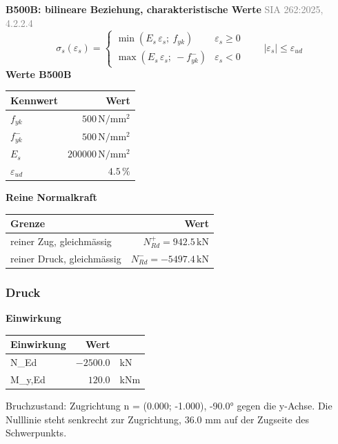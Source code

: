 \documentclass[11pt,a4paper]{article}
\newcommand{\normref}[1]{{\small\textcolor{gray}{#1}}}
\begin{document}
\noindent\textbf{B500B: bilineare Beziehung, charakteristische Werte} \hfill \normref{SIA 262:2025, 4.2.2.4}
\begin{equation*}
\sigma_s(\varepsilon_s) = \begin{cases} \min(E_s\,\varepsilon_s;\ f_{yk}) & \varepsilon_s \ge 0 \\[1ex] \max(E_s\,\varepsilon_s;\ -f_{yk}^{-}) & \varepsilon_s < 0 \end{cases} \qquad |\varepsilon_s| \le \varepsilon_{ud}
\end{equation*}
\noindent\textbf{Werte B500B}
\begin{longtable}{lr}
\hline
Kennwert & Wert \\
\hline
\endhead
$f_{yk}$ & $500\,\mathrm{N}/\mathrm{mm}^{2}$ \\
$f_{yk}^{-}$ & $500\,\mathrm{N}/\mathrm{mm}^{2}$ \\
$E_s$ & $200000\,\mathrm{N}/\mathrm{mm}^{2}$ \\
$\varepsilon_{ud}$ & $4.5\,\%$ \\
\hline
\end{longtable}
\noindent\textbf{Reine Normalkraft}
\begin{longtable}{lr}
\hline
Grenze & Wert \\
\hline
\endhead
reiner Zug, gleichmässig & $N_{Rd}^{+} = 942.5\,\mathrm{kN}$ \\
reiner Druck, gleichmässig & $N_{Rd}^{-} = -5497.4\,\mathrm{kN}$ \\
\hline
\end{longtable}
\subsubsection{Druck}
\noindent\textbf{Einwirkung}
\begin{longtable}{lrl}
\hline
Einwirkung & Wert &  \\
\hline
\endhead
N\_Ed & $-2500.0$ & kN \\
M\_y,Ed & $120.0$ & kNm \\
\hline
\end{longtable}
Bruchzustand: Zugrichtung n = (0.000; -1.000), -90.0° gegen die y-Achse. Die Nulllinie steht senkrecht zur Zugrichtung, 36.0 mm auf der Zugseite des Schwerpunkts.
\end{document}
